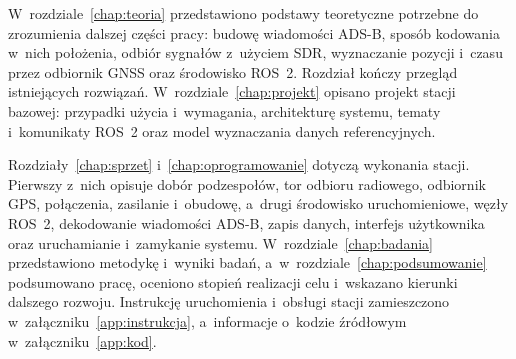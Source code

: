 W~rozdziale~\ref{chap:teoria} przedstawiono podstawy teoretyczne potrzebne do zrozumienia dalszej części pracy: budowę wiadomości ADS-B, sposób kodowania w~nich położenia, odbiór sygnałów z~użyciem SDR, wyznaczanie pozycji i~czasu przez odbiornik GNSS oraz środowisko ROS~2. Rozdział kończy przegląd istniejących rozwiązań. W~rozdziale~\ref{chap:projekt} opisano projekt stacji bazowej: przypadki użycia i~wymagania, architekturę systemu, tematy i~komunikaty ROS~2 oraz model wyznaczania danych referencyjnych.

Rozdziały~\ref{chap:sprzet} i~\ref{chap:oprogramowanie} dotyczą wykonania stacji. Pierwszy z~nich opisuje dobór podzespołów, tor odbioru radiowego, odbiornik GPS, połączenia, zasilanie i~obudowę, a~drugi środowisko uruchomieniowe, węzły ROS~2, dekodowanie wiadomości ADS-B, zapis danych, interfejs użytkownika oraz uruchamianie i~zamykanie systemu. W~rozdziale~\ref{chap:badania} przedstawiono metodykę i~wyniki badań, a~w~rozdziale~\ref{chap:podsumowanie} podsumowano pracę, oceniono stopień realizacji celu i~wskazano kierunki dalszego rozwoju. Instrukcję uruchomienia i~obsługi stacji zamieszczono w~załączniku~\ref{app:instrukcja}, a~informacje o~kodzie źródłowym w~załączniku~\ref{app:kod}.